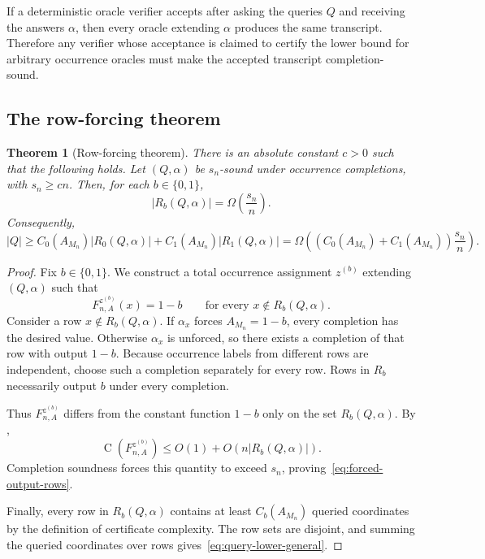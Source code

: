 \documentclass[11pt]{article}
\newtheorem{theorem}{Theorem}[section]
\theoremstyle{definition}
\newcommand{\bits}{\{0,1\}}
\newcommand{\Ckt}{\operatorname{C}}
\begin{document}
If a deterministic oracle verifier accepts after asking the queries $Q$ and receiving the answers $\alpha$, then every oracle extending $\alpha$ produces the same transcript. Therefore any verifier whose acceptance is claimed to certify the lower bound for arbitrary occurrence oracles must make the accepted transcript completion-sound.

\subsection{The row-forcing theorem}

\begin{theorem}[Row-forcing theorem]\label{thm:row-forcing}
There is an absolute constant $c>0$ such that the following holds. Let $(Q,\alpha)$ be $s_n$-sound under occurrence completions, with $s_n\ge cn$. Then, for each $b\in\bits$,
\begin{equation}\label{eq:forced-output-rows}
  |R_b(Q,\alpha)|=\Omega\!\left(\frac{s_n}{n}\right).
\end{equation}
Consequently,
\begin{equation}\label{eq:query-lower-general}
  |Q|
  \ge C_0(A_{M_n})|R_0(Q,\alpha)|
      +C_1(A_{M_n})|R_1(Q,\alpha)|
  =\Omega\!\left(
      (C_0(A_{M_n})+C_1(A_{M_n}))\frac{s_n}{n}
    \right).
\end{equation}
\end{theorem}

\begin{proof}
Fix $b\in\bits$. We construct a total occurrence assignment $z^{(b)}$ extending $(Q,\alpha)$ such that
\begin{equation}\label{eq:baseline-completion}
  F_{n,A}^{z^{(b)}}(x)=1-b
  \qquad\text{for every }x\notin R_b(Q,\alpha).
\end{equation}
Consider a row $x\notin R_b(Q,\alpha)$. If $\alpha_x$ forces $A_{M_n}=1-b$, every completion has the desired value. Otherwise $\alpha_x$ is unforced, so there exists a completion of that row with output $1-b$. Because occurrence labels from different rows are independent, choose such a completion separately for every row. Rows in $R_b$ necessarily output $b$ under every completion.

Thus $F_{n,A}^{z^{(b)}}$ differs from the constant function $1-b$ only on the set $R_b(Q,\alpha)$. By ,
\[
  \Ckt(F_{n,A}^{z^{(b)}})
  \le O(1)+O(n|R_b(Q,\alpha)|).
\]
Completion soundness forces this quantity to exceed $s_n$, proving~\eqref{eq:forced-output-rows}.

Finally, every row in $R_b(Q,\alpha)$ contains at least $C_b(A_{M_n})$ queried coordinates by the definition of certificate complexity. The row sets are disjoint, and summing the queried coordinates over rows gives~\eqref{eq:query-lower-general}.
\end{proof}
\end{document}
